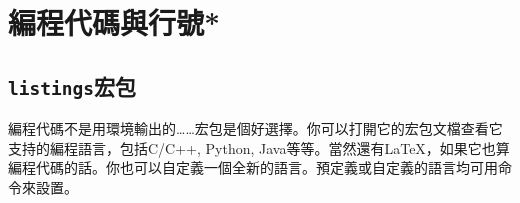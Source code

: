 \section{編程代碼與行號*}
\label{sec:coding}
\subsection{\texttt{listings}宏包}
編程代碼不是用環境輸出的……宏包是個好選擇。你可以打開它的宏包文檔查看它支持的編程語言，包括C/C++, Python, Java等等。當然還有\LaTeX，如果它也算編程代碼的話。你也可以自定義一個全新的語言。預定義或自定義的語言均可用命令來設置。
\begin{latex}
\end{latex}


